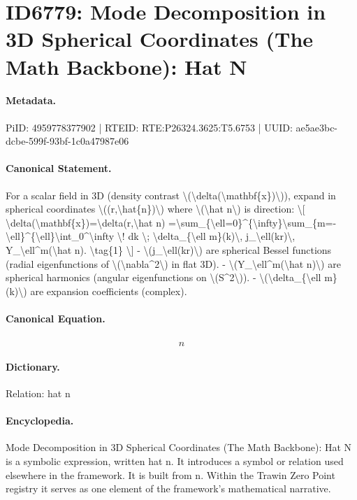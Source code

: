 \section*{ID6779: Mode Decomposition in 3D Spherical Coordinates (The Math Backbone): Hat N}
\paragraph{Metadata.}
PiID: 4959778377902 | RTEID: RTE:P26324.3625:T5.6753 | UUID: ae5ae3bc-dcbe-599f-93bf-1c0a47987e06

\paragraph{Canonical Statement.}
For a scalar field in 3D (density contrast \textbackslash{}(\textbackslash{}delta(\textbackslash{}mathbf\{x\})\textbackslash{})), expand in spherical coordinates \textbackslash{}((r,\textbackslash{}hat\{n\})\textbackslash{}) where \textbackslash{}(\textbackslash{}hat n\textbackslash{}) is direction: \textbackslash{}[ \textbackslash{}delta(\textbackslash{}mathbf\{x\})=\textbackslash{}delta(r,\textbackslash{}hat n) =\textbackslash{}sum\_\{\textbackslash{}ell=0\}\textasciicircum{}\{\textbackslash{}infty\}\textbackslash{}sum\_\{m=-\textbackslash{}ell\}\textasciicircum{}\{\textbackslash{}ell\}\textbackslash{}int\_0\textasciicircum{}\textbackslash{}infty \textbackslash{}! dk \textbackslash{}; \textbackslash{}delta\_\{\textbackslash{}ell m\}(k)\textbackslash{}, j\_\textbackslash{}ell(kr)\textbackslash{}, Y\_\textbackslash{}ell\textasciicircum{}m(\textbackslash{}hat n). \textbackslash{}tag\{1\} \textbackslash{}] - \textbackslash{}(j\_\textbackslash{}ell(kr)\textbackslash{}) are spherical Bessel functions (radial eigenfunctions of \textbackslash{}(\textbackslash{}nabla\textasciicircum{}2\textbackslash{}) in flat 3D). - \textbackslash{}(Y\_\textbackslash{}ell\textasciicircum{}m(\textbackslash{}hat n)\textbackslash{}) are spherical harmonics (angular eigenfunctions on \textbackslash{}(S\textasciicircum{}2\textbackslash{})). - \textbackslash{}(\textbackslash{}delta\_\{\textbackslash{}ell m\}(k)\textbackslash{}) are expansion coefficients (complex).

\paragraph{Canonical Equation.}
\[
\hat n
\]

\paragraph{Dictionary.}
Relation: hat n

\paragraph{Encyclopedia.}
Mode Decomposition in 3D Spherical Coordinates (The Math Backbone): Hat N is a symbolic expression, written hat n. It introduces a symbol or relation used elsewhere in the framework. It is built from n. Within the Trawin Zero Point registry it serves as one element of the framework's mathematical narrative.

